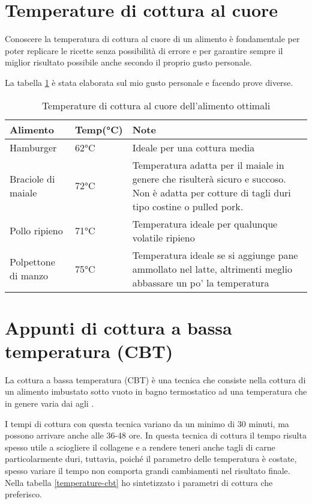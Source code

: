 \section{Temperature di cottura al cuore}
Conoscere la temperatura di cottura al cuore di un alimento è fondamentale per poter replicare le ricette senza possibilità di errore e per garantire sempre il miglior risultato possibile anche secondo il proprio gusto personale.

La tabella \ref{temperature-al-cuore} è stata elaborata sul mio gusto personale e facendo prove diverse.



\begin{table}
\begin{tabular}{llp{}}
\toprule
Alimento				&	Temp(°C)		&		Note		\\
\midrule
Hamburger			& 	62°C 		& Ideale per una cottura media\\
Braciole di maiale	& 	72°C 		& Temperatura adatta per il maiale in genere che risulterà sicuro e succoso. Non è adatta per cotture di tagli duri tipo costine o pulled pork. \\
Pollo ripieno 		& 	71°C 		& Temperatura ideale per qualunque volatile ripieno\\
Polpettone di manzo	&	75°C 		& Temperatura ideale se si aggiunge pane ammollato nel latte, altrimenti meglio abbassare un po' la temperatura\\
\bottomrule
\end{tabular}
\label{temperature-al-cuore}
\caption{Temperature di cottura al cuore dell'alimento ottimali}
\end{table}

\section{Appunti di cottura a bassa temperatura (CBT)}
La cottura a bassa temperatura (CBT) è una tecnica che consiste nella cottura di un alimento imbustato sotto vuoto in bagno termostatico ad una temperatura che in genere varia dai  agli .

I tempi di cottura con questa tecnica variano da un minimo di 30 minuti, ma possono arrivare anche alle 36-48 ore. In questa tecnica di cottura il tempo risulta spesso utile a sciogliere il collagene e a rendere teneri anche tagli di carne particolarmente duri, tuttavia, poiché il parametro delle temperatura è costate, spesso variare il tempo non comporta grandi cambiamenti nel risultato finale. Nella tabella \ref{temperature-cbt} ho sintetizzato i parametri di cottura che preferisco.

